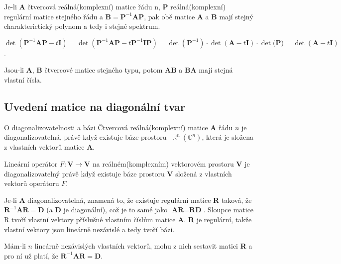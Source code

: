 \begin{veta}
Je-li \textbf{A} čtvercová reálná(komplexní) matice řádu n, \textbf{P} reálná(komplexní) regulární matice stejného řádu a $\textbf{B}=\textbf{P}^{-1}\textbf{A}\textbf{P}$, pak obě matice \textbf{A} a \textbf{B} mají stejný charakterictický polynom a tedy i stejné spektrum.

\medskip
\begin{dukaz}
$\det(\textbf{P}^{-1}\textbf{AP}-t\textbf{I})=\det(\textbf{P}^{-1}\textbf{AP}-t\textbf{P}^{-1}\textbf{IP})=\det(\textbf{P}^{-1})\cdot\det(\mathbf{A}-t\mathbf{I})\cdot{\det(\mathbf{P}})=\det(\mathbf{A}-t\mathbf{I})$.
\end{dukaz}
\end{veta}

\begin{veta}
Jsou-li \textbf{A}, \textbf{B} čtvercové matice stejného typu, potom \textbf{AB} a \textbf{BA} mají stejná vlastní čísla.
\end{veta}

\subsection{Uvedení matice na diagonální tvar}

\begin{vetaN}{O diagonalizovatelnosti a bázi}
Čtvercová reálná(komplexní) matice \textbf{A} řádu $n$ je diagonalizovatelná, právě když existuje báze prostoru \ $\mathbb{R}^n\ (\mathbb{C}^n)$, která je složena z vlastních vektorů matice \textbf{A}.

Lineární operátor $F:\textbf{V}\rightarrow$\textbf{V} na reálném(komplexním) vektorovém prostoru \textbf{V} je diagonalizovatelný právě když existuje báze prostoru \textbf{V} složená z vlastních vektorů operátoru $F$.

\medskip
\begin{dukaz}
Je-li \textbf{A} diagonalizovatelná, znamená to, že existuje regulární matice \textbf{R} taková, že $\textbf{R}^{-1}\textbf{AR} = \textbf{D}$ (a \textbf{D} je diagonální), což je to samé jako $\textbf{AR} = \textbf{RD}$. Sloupce matice R tvoří vlastní vektory příslušné vlastním číslům matice \textbf{A}. \textbf{R} je regulární, takže vlastní vektory jsou lineárně nezávislé a tedy tvoří bázi.

Mám-li $n$ lineárně nezávislých vlastních vektorů, mohu z nich sestavit matici \textbf{R} a pro ní už platí, že $\textbf{R}^{-1}\textbf{AR} = \textbf{D}$.
\end{dukaz}
\end{vetaN}

